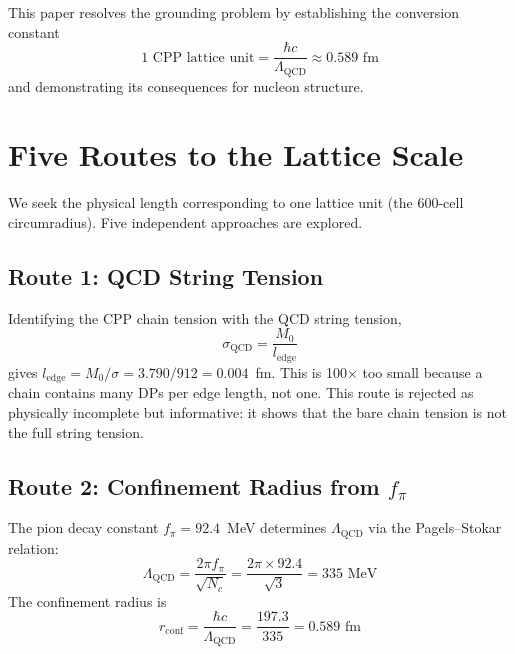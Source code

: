 \documentclass[12pt,a4paper]{article}
\begin{document}
This paper resolves the grounding problem by establishing the conversion constant
\begin{equation}
\boxed{1 \text{ CPP lattice unit} = \frac{\hbar c}{\Lambda_{\mathrm{QCD}}} \approx 0.589 \text{ fm}}
\label{eq:conversion}
\end{equation}
and demonstrating its consequences for nucleon structure.

\section{Five Routes to the Lattice Scale}

We seek the physical length corresponding to one lattice unit (the 600-cell circumradius). Five independent approaches are explored.

\subsection{Route 1: QCD String Tension}

Identifying the CPP chain tension with the QCD string tension,
\begin{equation}
\sigma_{\mathrm{QCD}} = \frac{M_0}{l_{\mathrm{edge}}}
\end{equation}
gives $l_{\mathrm{edge}} = M_0/\sigma = 3.790/912 = 0.004$~fm. This is 100$\times$ too small because a chain contains many DPs per edge length, not one. This route is rejected as physically incomplete but informative: it shows that the bare chain tension is not the full string tension.

\subsection{Route 2: Confinement Radius from $f_\pi$}

The pion decay constant $f_\pi = 92.4$~MeV determines $\Lambda_{\mathrm{QCD}}$ via the Pagels--Stokar relation:
\begin{equation}
\Lambda_{\mathrm{QCD}} = \frac{2\pi f_\pi}{\sqrt{N_c}} = \frac{2\pi \times 92.4}{\sqrt{3}} = 335 \text{ MeV}
\end{equation}
The confinement radius is
\begin{equation}
r_{\mathrm{conf}} = \frac{\hbar c}{\Lambda_{\mathrm{QCD}}} = \frac{197.3}{335} = 0.589 \text{ fm}
\label{eq:route2}
\end{equation}
\end{document}
